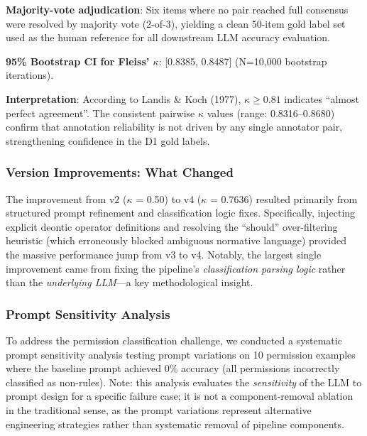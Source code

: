\textbf{Majority-vote adjudication}: Six items where no pair reached full consensus were resolved by majority vote (2-of-3), yielding a clean 50-item gold label set used as the human reference for all downstream LLM accuracy evaluation.

\textbf{95\% Bootstrap CI for Fleiss' $\kappa$}: [0.8385, 0.8487] (N=10,000 bootstrap iterations).

\textbf{Interpretation}: According to Landis \& Koch (1977), $\kappa \geq 0.81$ indicates ``almost perfect agreement''. The consistent pairwise $\kappa$ values (range: 0.8316--0.8680) confirm that annotation reliability is not driven by any single annotator pair, strengthening confidence in the D1 gold labels.

\subsubsection{Version Improvements: What Changed}

The improvement from v2 ($\kappa$ = 0.50) to v4 ($\kappa$ = 0.7636) resulted primarily from structured prompt refinement and classification logic fixes. Specifically, injecting explicit deontic operator definitions and resolving the ``should'' over-filtering heuristic (which erroneously blocked ambiguous normative language) provided the massive performance jump from v3 to v4. Notably, the largest single improvement came from fixing the pipeline's \textit{classification parsing logic} rather than the \textit{underlying LLM}---a key methodological insight.

\subsubsection{Prompt Sensitivity Analysis}

To address the permission classification challenge, we conducted a systematic prompt sensitivity analysis testing prompt variations on 10 permission examples where the baseline prompt achieved 0\% accuracy (all permissions incorrectly classified as non-rules). Note: this analysis evaluates the \textit{sensitivity} of the LLM to prompt design for a specific failure case; it is not a component-removal ablation in the traditional sense, as the prompt variations represent alternative engineering strategies rather than systematic removal of pipeline components.


